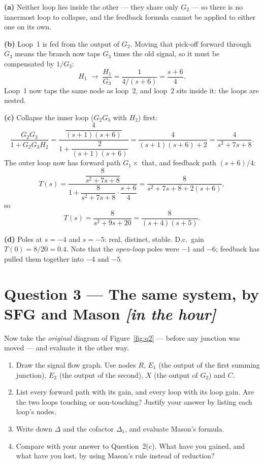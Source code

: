 \documentclass[11pt,a4paper]{article}
\newcommand{\inhour}{\hfill{\small\color{faccent}\itshape[in the hour]}}
\begin{document}
\begin{solution}
\textbf{(a)} Neither loop lies inside the other --- they share only $G_2$ ---
so there is no innermost loop to collapse, and the feedback formula cannot be
applied to either one on its own.

\medskip
\textbf{(b)} Loop~1 is fed from the output of $G_2$. Moving that pick-off
forward through $G_3$ means the branch now taps $G_3$ times the old signal, so
it must be compensated by $1/G_3$:
\[
  H_1 \;\longrightarrow\; \frac{H_1}{G_3}=\frac{1}{4/(s+6)}=\frac{s+6}{4}.
\]
Loop~1 now taps the same node as loop~2, and loop~2 sits inside it: the loops
are nested.

\medskip
\textbf{(c)} Collapse the inner loop ($G_2G_3$ with $H_2$) first:
\[
  \frac{G_2G_3}{1+G_2G_3H_2}
  =\frac{\dfrac{4}{(s+1)(s+6)}}{1+\dfrac{2}{(s+1)(s+6)}}
  =\frac{4}{(s+1)(s+6)+2}
  =\frac{4}{s^{2}+7s+8}.
\]
The outer loop now has forward path $G_1\times$ that, and feedback path
$(s+6)/4$:
\[
  T(s)=\frac{\dfrac{8}{s^{2}+7s+8}}
            {1+\dfrac{8}{s^{2}+7s+8}\cdot\dfrac{s+6}{4}}
   =\frac{8}{s^{2}+7s+8+2(s+6)} ,
\]
so
\[
  T(s)=\frac{8}{s^{2}+9s+20}=\frac{8}{(s+4)(s+5)} .
\]

\medskip
\textbf{(d)} Poles at $s=-4$ and $s=-5$: real, distinct, stable. D.c.\ gain
$T(0)=8/20=0.4$. Note that the \emph{open-loop} poles were $-1$ and $-6$;
feedback has pulled them together into $-4$ and $-5$.
\end{solution}

\section*{Question 3 --- The same system, by SFG and Mason \inhour}

Now take the \emph{original} diagram of Figure~\ref{fig:q2} --- before any
junction was moved --- and evaluate it the other way.

\begin{enumerate}[label=(\alph*)]
\item Draw the signal flow graph. Use nodes $R$, $E_1$ (the output of the first
      summing junction), $E_2$ (the output of the second), $X$ (the output of
      $G_2$) and $C$.
\item List every forward path with its gain, and every loop with its loop gain.
      Are the two loops touching or non-touching? Justify your answer by
      listing each loop's nodes.
\item Write down $\Delta$ and the cofactor $\Delta_1$, and evaluate Mason's
      formula.
\item Compare with your answer to Question~2(c). What have you gained, and
      what have you lost, by using Mason's rule instead of reduction?
\end{enumerate}
\end{document}
